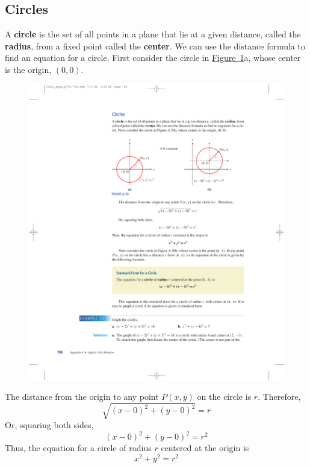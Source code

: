 \documentclass[10pt,]{book}
\newcommand{\terminology}[1]{\textbf{#1}}
\theoremstyle{plain}
\theoremstyle{definition}
\theoremstyle{definition}
\theoremstyle{definition}
\numberwithin{equation}{part}
\begin{document}
\subsection[{Circles}]{Circles}\label{subsection-58}
A \terminology{circle} is the set of all points in a plane that lie at a given distance, called the \terminology{radius}, from a fixed point called the \terminology{center}. We can use the distance formula to find an equation for a circle. First consider the circle in \hyperref[fig-circles]{Figure~\ref{fig-circles}}a, whose center is the origin, \((0, 0)\). \leavevmode%
\begin{figure}
\centering
\includegraphics[width=0.9\linewidth]{images/fig-circles}
\caption{\label{fig-circles}}
\end{figure}
%
\par
The distance from the origin to any point \(P(x, y)\) on the circle is \(r\). Therefore,%
\begin{equation*}
\sqrt{(x − 0)^2 + (y − 0)^2} = r 
\end{equation*}
Or, squaring both sides,%
\begin{equation*}
(x − 0)^2 + (y − 0)^2 = r^2
\end{equation*}
Thus, the equation for a circle of radius \(r\) centered at the origin is%
\begin{equation*}
x^2 + y^2 = r^2
\end{equation*}
\end{document}
